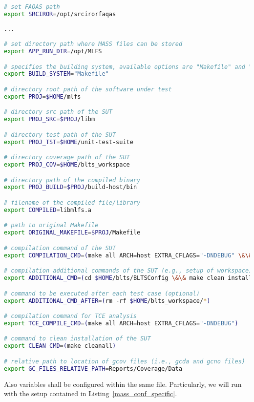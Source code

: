 \begin{lstlisting}[language=bash, label=mass_conf_single, caption=\MASS variables. Excerpt of mass\_conf.sh file.]
# set FAQAS path
export SRCIROR=/opt/srcirorfaqas
                                                     
...

# set directory path where MASS files can be stored
export APP_RUN_DIR=/opt/MLFS

# specifies the building system, available options are "Makefile" and "waf"
export BUILD_SYSTEM="Makefile"

# directory root path of the software under test
export PROJ=$HOME/mlfs

# directory src path of the SUT
export PROJ_SRC=$PROJ/libm

# directory test path of the SUT
export PROJ_TST=$HOME/unit-test-suite

# directory coverage path of the SUT
export PROJ_COV=$HOME/blts_workspace

# directory path of the compiled binary
export PROJ_BUILD=$PROJ/build-host/bin

# filename of the compiled file/library
export COMPILED=libmlfs.a

# path to original Makefile
export ORIGINAL_MAKEFILE=$PROJ/Makefile

# compilation command of the SUT
export COMPILATION_CMD=(make all ARCH=host EXTRA_CFLAGS="-DNDEBUG" \&\& make all COVERAGE="true" ARCH=host_cov EXTRA_CFLAGS="-DNDEBUG")

# compilation additional commands of the SUT (e.g., setup of workspace)
export ADDITIONAL_CMD=(cd $HOME/blts/BLTSConfig \&\& make clean install INSTALL_PATH="$HOME/blts_install" \&\& cd $HOME/blts_workspace \&\& $HOME/blts_install/bin/blts_app --init)

# command to be executed after each test case (optional)
export ADDITIONAL_CMD_AFTER=(rm -rf $HOME/blts_workspace/*)

# compilation command for TCE analysis
export TCE_COMPILE_CMD=(make all ARCH=host EXTRA_CFLAGS="-DNDEBUG")

# command to clean installation of the SUT
export CLEAN_CMD=(make cleanall)

# relative path to location of gcov files (i.e., gcda and gcno files)
export GC_FILES_RELATIVE_PATH=Reports/Coverage/Data
\end{lstlisting}

Also \MASS variables shall be configured within the same file. Particularly, we will run \MASS with the setup contained in Listing~\ref{mass_conf_specific}. 

